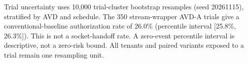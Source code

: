 Trial uncertainty uses 10,000 trial-cluster bootstrap resamples (seed 20261115), stratified by AVD and schedule. The 350 stream-wrapper AVD-A trials give a conventional-baseline authorization rate of 26.0\% (percentile interval [25.8\%, 26.3\%]). This is not a socket-handoff rate. A zero-event percentile interval is descriptive, not a zero-risk bound. All tenants and paired variants exposed to a trial remain one resampling unit.

